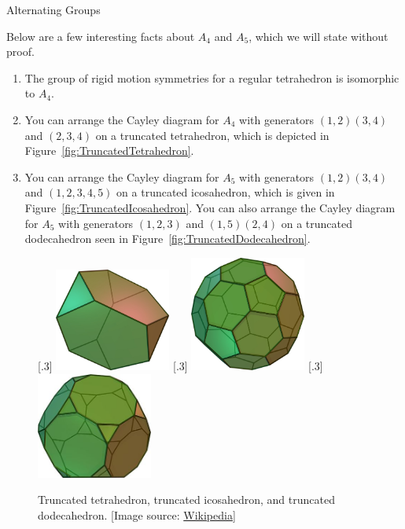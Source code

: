 \begin{section}{Alternating Groups}
\begin{remark}
Below are a few interesting facts about $A_4$ and $A_5$, which we will state without proof.
\begin{enumerate}[label=\rm{(\alph*)}]
\item The group of rigid motion symmetries for a regular tetrahedron is isomorphic to $A_4$.
\item You can arrange the Cayley diagram for $A_4$ with generators $(1,2)(3,4)$ and $(2,3,4)$ on a truncated tetrahedron, which is depicted in Figure~\ref{fig:TruncatedTetrahedron}.
\item You can arrange the Cayley diagram for $A_5$ with generators $(1,2)(3,4)$ and $(1,2,3,4,5)$ on a truncated icosahedron, which is given in Figure~\ref{fig:TruncatedIcosahedron}.  You can also arrange the Cayley diagram for $A_5$ with generators $(1,2,3)$ and $(1,5)(2,4)$ on a truncated dodecahedron seen in Figure~\ref{fig:TruncatedDodecahedron}. 
\end{enumerate}
\end{remark}

\begin{figure}[!ht]
\begin{center}
\subcaptionbox{\label{fig:TruncatedTetrahedron}}[.3\textwidth]{
\includegraphics[width=1.5in]{TruncatedTetrahedron}
}
\subcaptionbox{\label{fig:TruncatedIcosahedron}}[.3\textwidth]{
\includegraphics[width=1.5in]{TruncatedIcosahedron}}
\subcaptionbox{\label{fig:TruncatedDodecahedron}}[.3\textwidth]{
\includegraphics[width=1.5in]{TruncatedDodecahedron}}
\caption{Truncated tetrahedron, truncated icosahedron, and truncated dodecahedron. [Image source: \href{https://en.wikipedia.org/wiki/Truncated_tetrahedron}{Wikipedia}]}
\end{center}
\end{figure}

\end{section}
